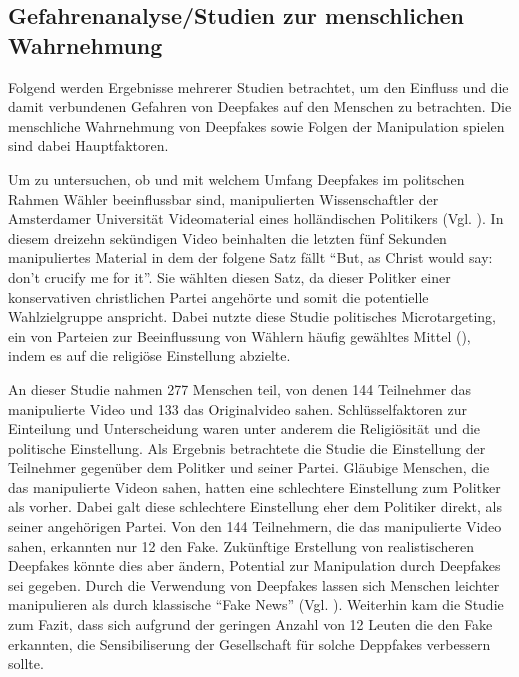 \subsection{Gefahrenanalyse/Studien zur menschlichen Wahrnehmung}
Folgend werden Ergebnisse mehrerer Studien betrachtet, um den Einfluss und die damit verbundenen Gefahren von Deepfakes auf den Menschen zu betrachten.
Die menschliche Wahrnehmung von Deepfakes sowie Folgen der Manipulation spielen sind dabei Hauptfaktoren.
\par
Um zu untersuchen, ob und mit welchem Umfang Deepfakes im politschen Rahmen Wähler beeinflussbar sind, manipulierten Wissenschaftler der Amsterdamer Universität Videomaterial eines holländischen Politikers (Vgl. \cite{Dobber2020}).
In diesem dreizehn sekündigen Video beinhalten die letzten fünf Sekunden manipuliertes Material in dem der folgene Satz fällt ``But, as Christ would say: don’t crucify me for it''.
Sie wählten diesen Satz, da dieser Politker einer konservativen christlichen Partei angehörte und somit die potentielle Wahlzielgruppe anspricht.
Dabei nutzte diese Studie politisches Microtargeting, ein von Parteien zur Beeinflussung von Wählern häufig gewähltes Mittel (\cite{Papakyriakopoulos2017}), indem es auf die religiöse Einstellung abzielte.
\par
An dieser Studie nahmen 277 Menschen teil, von denen 144 Teilnehmer das manipulierte Video und 133 das Originalvideo sahen.
Schlüsselfaktoren zur Einteilung und Unterscheidung waren unter anderem die Religiösität und die politische Einstellung.
Als Ergebnis betrachtete die Studie die Einstellung der Teilnehmer gegenüber dem Politker und seiner Partei.
Gläubige Menschen, die das manipulierte Videon sahen, hatten eine schlechtere Einstellung zum Politker als vorher.
Dabei galt diese schlechtere Einstellung eher dem Politiker direkt, als seiner angehörigen Partei.
Von den 144 Teilnehmern, die das manipulierte Video sahen, erkannten nur 12 den Fake.
Zukünftige Erstellung von realistischeren Deepfakes könnte dies aber ändern, Potential zur Manipulation durch Deepfakes sei gegeben.
Durch die Verwendung von Deepfakes lassen sich Menschen leichter manipulieren als durch klassische ``Fake News'' (Vgl. \cite{Dobber2020}).
Weiterhin kam die Studie zum Fazit, dass sich aufgrund der geringen Anzahl von 12 Leuten die den Fake erkannten, die Sensibiliserung der Gesellschaft für solche Deppfakes verbessern sollte.
